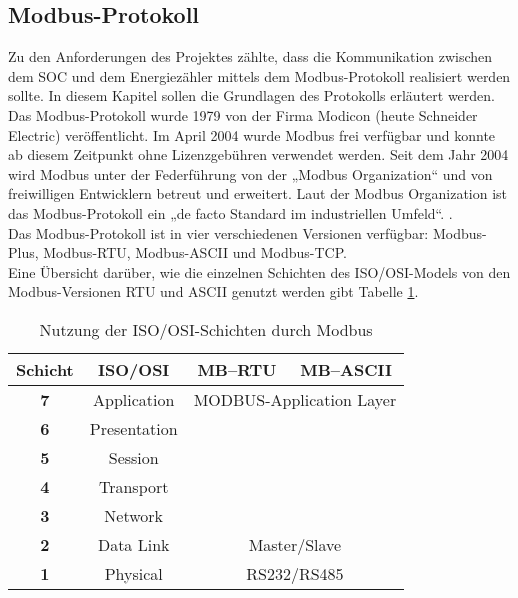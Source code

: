 \documentclass[../Bachelorarbeit.tex]{subfiles}
\begin{document}
\subsection{Modbus-Protokoll}
\label{subsubsec:modbus} 
Zu den Anforderungen des Projektes zählte, dass die Kommunikation zwischen dem \ac{SOC} und dem Energiezähler mittels dem Modbus-Protokoll realisiert werden sollte. In diesem Kapitel sollen die Grundlagen des Protokolls erläutert werden.\\
Das Modbus-Protokoll wurde 1979 von der Firma Modicon (heute Schneider Electric) 
veröffentlicht. Im April 2004 wurde Modbus frei verfügbar und konnte ab diesem Zeitpunkt ohne Lizenzgebühren verwendet werden. Seit dem Jahr 2004 wird Modbus unter der Federführung von der „Modbus Organization“ und von freiwilligen Entwicklern betreut und erweitert. Laut der Modbus Organization ist das Modbus-Protokoll ein „de facto Standard im industriellen Umfeld“. 
\parencite[vgl.][]{modbus_faq}. \\
Das Modbus-Protokoll ist in vier verschiedenen Versionen verfügbar: Modbus-Plus, Modbus-\ac{RTU}, Modbus-\ac{ASCII} und Modbus-\ac{TCP}. \\
Eine Übersicht darüber, wie die einzelnen Schichten des \acs{ISO}/\acs{OSI}-Models von den Modbus-Versionen RTU und ASCII genutzt werden gibt Tabelle \ref{tab:iso/osi_modbus}.\\

\begin{table}[h]
\begin{tabular}{|c|c|c|c|} 
\hline 
\rule[0ex]{0pt}{2.5ex} \textbf{Schicht} & \textbf{\acs{ISO}/\acs{OSI}} & \textbf{MB–RTU} & \textbf{MB–ASCII} \\ 
\hline 
\rule[-0ex]{0pt}{2.5ex} \textbf{7} & Application & \multicolumn{2}{c|}{MODBUS-Application Layer} \\ 
\hline 
\rule[-0ex]{0pt}{2.5ex} \textbf{6} & Presentation &  &  \\ 
\hline 
\rule[-0ex]{0pt}{2.5ex} \textbf{5} & Session &  &  \\ 
\hline 
\rule[-0ex]{0pt}{2.5ex} \textbf{4} & Transport &  &  \\ 
\hline 
\rule[-0ex]{0pt}{2.5ex} \textbf{3} & Network & &  \\ 
\hline 
\rule[-0ex]{0pt}{2.5ex} \textbf{2} & Data Link & \multicolumn{2}{c|}{Master/Slave} \\ 
\hline 
\rule[-0ex]{0pt}{2.5ex} \textbf{1} & Physical & \multicolumn{2}{c|}{RS232/RS485} \\ 
\hline 
\end{tabular} 
\caption{Nutzung der ISO/OSI-Schichten durch Modbus\parencite[vgl.][S. 310 - Tabelle wurde durch Verfasser angepasst]{bussyteme}}
\label{tab:iso/osi_modbus}
\end{table}
\end{document}
